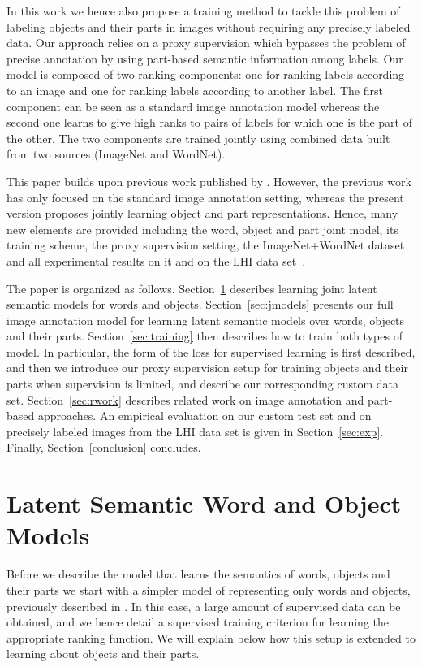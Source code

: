 In this work we hence also propose a training method to tackle this problem of labeling objects
and their parts in images without requiring any precisely labeled data.
Our approach relies on a proxy supervision which bypasses the problem
of precise annotation by using part-based semantic information among labels.
%
Our model is composed of two ranking components: one for ranking
labels according to an image and one for ranking labels according to
another label.
%
The first component can be seen as a standard image annotation model
whereas the second one learns to give high ranks to pairs of
labels for which one is the part of the other.
%
The two components are trained jointly using combined data built from two sources (ImageNet and WordNet).

This paper builds upon previous work published by \cite{image-wsabie}.
%
However, the previous work has only focused on the standard image annotation setting, whereas 
the present version proposes jointly learning 
object and part representations.
% 
Hence, many new elements are provided including the word, object and part joint model, its training scheme, the proxy 
supervision setting, the ImageNet+WordNet dataset and all experimental results on it and on the LHI data set~\cite{Yao:2007}.

The paper is organized as follows. 
Section~\ref{sec:joint-word-object} describes learning joint latent semantic models for words and objects.
Section~\ref{sec:jmodels} presents our full image annotation model for learning 
latent semantic models over words, objects and their parts.
Section~\ref{sec:training} then describes how to train both types of model.
In particular, the form of the loss for supervised learning is first described,
and then we introduce
our proxy supervision setup for training objects and their parts when supervision is limited,
 and describe our corresponding custom data set.
Section~\ref{sec:rwork} describes related work on image annotation and
part-based approaches. An empirical evaluation  on our custom test set and on precisely labeled images from
the LHI data set is given in Section~\ref{sec:exp}.
Finally, Section~\ref{conclusion} concludes.

\section{Latent Semantic Word and Object Models}\label{sec:joint-word-object} \label{jwie}

Before we describe the model that learns the semantics of words,
objects and their parts we start with a simpler model of representing
only words and objects, previously described in \cite{image-wsabie}.
In this case, a large amount of supervised data can be obtained, and
we hence detail a supervised training criterion for learning the
appropriate ranking function. We will explain below how this setup is
extended to learning about objects and their parts.

